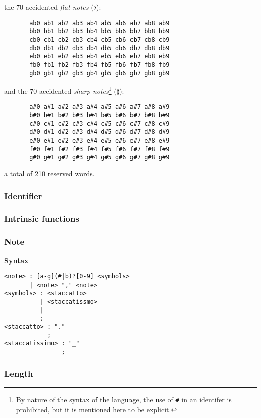 the 70 accidented \textit{flat notes} ($\flat$):

\begin{verbatim}
       ab0 ab1 ab2 ab3 ab4 ab5 ab6 ab7 ab8 ab9
       bb0 bb1 bb2 bb3 bb4 bb5 bb6 bb7 bb8 bb9
       cb0 cb1 cb2 cb3 cb4 cb5 cb6 cb7 cb8 cb9
       db0 db1 db2 db3 db4 db5 db6 db7 db8 db9
       eb0 eb1 eb2 eb3 eb4 eb5 eb6 eb7 eb8 eb9
       fb0 fb1 fb2 fb3 fb4 fb5 fb6 fb7 fb8 fb9
       gb0 gb1 gb2 gb3 gb4 gb5 gb6 gb7 gb8 gb9
\end{verbatim}

and the 70 accidented \textit{sharp notes}\footnote{By nature of the syntax of
the language, the use of \protect\texttt{\#} in an identifer is prohibited,
but it is mentioned here to be explicit.} ($\sharp$):
\begin{verbatim}
       a#0 a#1 a#2 a#3 a#4 a#5 a#6 a#7 a#8 a#9
       b#0 b#1 b#2 b#3 b#4 b#5 b#6 b#7 b#8 b#9
       c#0 c#1 c#2 c#3 c#4 c#5 c#6 c#7 c#8 c#9
       d#0 d#1 d#2 d#3 d#4 d#5 d#6 d#7 d#8 d#9
       e#0 e#1 e#2 e#3 e#4 e#5 e#6 e#7 e#8 e#9
       f#0 f#1 f#2 f#3 f#4 f#5 f#6 f#7 f#8 f#9
       g#0 g#1 g#2 g#3 g#4 g#5 g#6 g#7 g#8 g#9
\end{verbatim}

a total of 210 reserved words.

\subsubsection{Identifier}

\subsubsection{Intrinsic functions}

\subsubsection{Note}

\np \textbf{Syntax}

\begin{verbatim}
<note> : [a-g](#|b)?[0-9] <symbols>
       | <note> "," <note>
<symbols> : <staccatto>
          | <staccatissmo>
          |
          ;
<staccatto> : "."
            ;
<staccatissimo> : "_"
                ;
\end{verbatim}

\subsubsection{Length}

